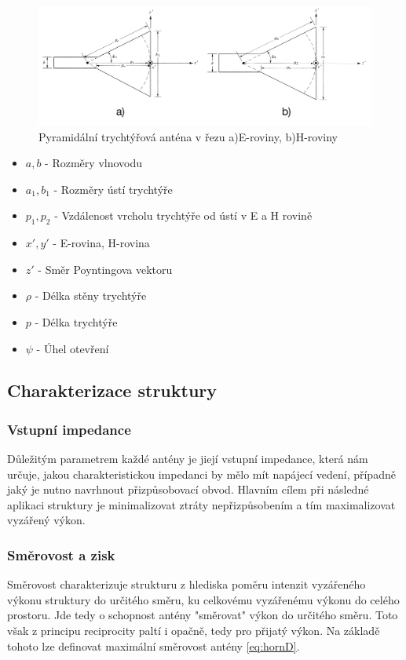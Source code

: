 \begin{figure}[h]
\begin{center}
\includegraphics[width=15cm]{pics/hornEH}
\caption{Pyramidální trychtýřová anténa v řezu a)E-roviny, b)H-roviny \cite{ConstantineTheory}}
\label{fig:hornEH}
\end{center}
\end{figure}
\begin{itemize}
\item $a, b$ - Rozměry vlnovodu
\item $a_1, b_1$ - Rozměry ústí trychtýře
\item $p_1, p_2$ - Vzdálenost vrcholu trychtýře od ústí v E a H rovině
\item $x', y'$ - E-rovina, H-rovina
\item $z'$ - Směr Poyntingova vektoru
\item $\rho$ - Délka stěny trychtýře
\item $p$ - Délka trychtýře
\item $\psi$ - Úhel otevření
\end{itemize}

\subsection{Charakterizace struktury}

\subsubsection{Vstupní impedance}
Důležitým parametrem každé antény je jiejí vstupní impedance, která nám určuje, jakou charakteristickou impedanci by mělo mít napájecí vedení, případně jaký je nutno navrhnout přizpůsobovací obvod. Hlavním cílem při následné aplikaci struktury je minimalizovat ztráty nepřizpůsobením a tím maximalizovat vyzářený výkon.

\subsubsection{Směrovost a zisk}
Směrovost charakterizuje strukturu z hlediska poměru intenzit vyzářeného výkonu struktury do určitého směru, ku celkovému vyzářenému výkonu do celého prostoru. Jde tedy o schopnost antény "směrovat" výkon do určitého směru. Toto však z principu reciprocity paltí i opačně, tedy pro přijatý výkon. Na základě tohoto lze definovat maximální směrovost antény \ref{eq:hornD}.

